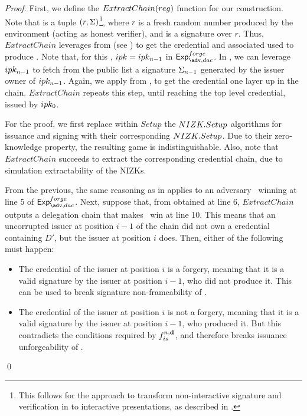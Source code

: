 \begin{proof}
  First, we define the $ExtractChain(reg)$ function for our construction.
  Note that \utrans is a tuple $(r,\Sigma)$\footnote{This follows for the approach
    to transform non-interactive signature and verification in \UAS to interactive
    presentations, as described in .}, where $r$ is a
  fresh random number produced by the environment (acting as honest verifier),
  and \Sig is a \CUASGen signature over $r$. Thus, $ExtractChain$ leverages
  \ExtractSign from \CUASGen (see ) to get the
  credential and associated \ipk used to produce \Sig. Note that, for this
  \ipk, $ipk = ipk_{n-1}$ in $\Exp^{forge}_{\adv,dac}$. In \CUASDAC, we can
  leverage $ipk_{n-1}$ to fetch from the public list a signature $\Sigma_{n-1}$
  generated by the issuer owner of $ipk_{n-1}$. Again, we apply \ExtractSign
  from \CUASGen, to get the credential one layer up in the chain.
  $ExtractChain$ repeats this step, until reaching the top level credential,
  issued by $ipk_0$.

  For the proof, we first replace within $Setup$ the $NIZK.Setup$ algorithms for
  issuance and signing with their corresponding $NIZK.Setup$. Due to their
  zero-knowledge property, the resulting game is indistinguishable. Also, note
  that $ExtractChain$ succeeds to extract the corresponding credential chain,
  due to simulation extractability of the NIZKs. 

  From the previous, the same reasoning as in  applies
  to an adversary \adv~winning at line 5 of $\Exp^{forge}_{\adv,dac}$. Next,
  suppose that, from \utrans obtained at line 6, $ExtractChain$ outputs a
  delegation chain that makes \adv~win at line 10. This means that an
  uncorrupted issuer at position $i-1$ of the chain did not own a credential
  containing $D'$, but the issuer at position $i$ does. Then, either of the
  following must happen:

  \begin{itemize}
  \item The credential of the issuer at position $i$ is a forgery, meaning that
    it is a valid signature by the issuer at position $i-1$, who did not produce
    it. This can be used to break signature non-frameability of \CUASGen.
  \item The credential of the issuer at position $i$ is not a forgery, meaning
    that it is a valid signature by the issuer at position $i-1$, who produced
    it. But this contradicts the conditions required by $f_{is}^{n,\mathbf{d}}$,
    and therefore breaks issuance unforgeability of \CUASGen.
  \end{itemize}
  \qed
\end{proof}

